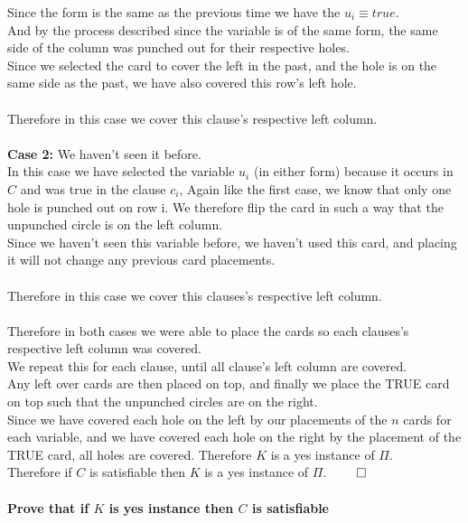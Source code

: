 \documentclass{article}
\begin{document}
      \indent Since the form is the same as the previous time we have the $u_{i} \equiv true$.\\
      \indent And by the process described since the variable is of the same form, the same side of the column was punched out for their respective holes.\\
      \indent Since we selected the card to cover the left in the past, and the hole is on the same side as the past, we have also covered this row's left hole.\\
      \\
      Therefore in this case we cover this clause's respective left column.\\
      \\
      \textbf{Case 2:} We haven't seen it before.\\
      In this case we have selected the variable $u_{i}$ (in either form) because it occurs in $C$ and was true in the clause $c_{i}$, Again like the first case, we know that only one hole is punched out on row i.
      We therefore flip the card in such a way that the unpunched circle is on the left column.\\
      Since we haven't seen this variable before, we haven't used this card, and placing it will not change any previous card placements.\\
      \\
      Therefore in this case we cover this clauses's respective left column.\\
      \\
      Therefore in both cases we were able to place the cards so each clauses's respective left column was covered.\\
      We repeat this for each clause, until all clause's left column are covered.\\
      Any left over cards are then placed on top, and finally we place the TRUE card on top such that the unpunched circles are on the right.\\
      Since we have covered each hole on the left by our placements of the $n$ cards for each variable, and we have covered each hole on the right by the placement of the TRUE card, all holes are covered.
      Therefore $K$ is a yes instance of $\Pi$.\\
      Therefore if $C$ is satisfiable then $K$ is a yes instance of $\Pi$. $\qed$\\
      \\
      \textbf{Prove that if $K$ is yes instance then $C$ is satisfiable}\\
\end{document}
